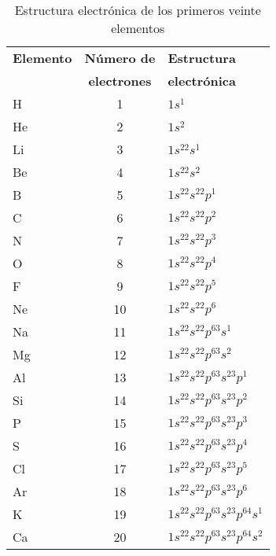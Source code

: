 \begin{table}[ht]
\caption[Estructuras electr\'onicas]{Estructura electr\'onica de los primeros veinte
elementos}
\label{tabla3.3}
\begin{center}
{\small
 \begin{tabular}{lcl}\hline
\textbf{Elemento} & \textbf{N\'umero de} &\textbf{ Estructura} \\
    &       \textbf{electrones}& \textbf{electr\'onica}\\ \hline
H   &  1 & $1s^1$\\
He  &  2 & $1s^2$\\
Li  &  3 & $1s^22s^1$\\
Be  &  4 & $1s^22s^2$\\
B   &  5 & $1s^22s^22p^1$\\
C   &  6 & $1s^22s^22p^2$\\
N   &  7 & $1s^22s^22p^3$\\
O   &  8 & $1s^22s^22p^4$\\
F   &  9 & $1s^22s^22p^5$\\
Ne  & 10 & $1s^22s^22p^6$\\
Na  & 11 & $1s^22s^22p^63s^1$\\
Mg  & 12 & $1s^22s^22p^63s^2$\\
Al  & 13 & $1s^22s^22p^63s^23p^1$\\
Si  & 14 & $1s^22s^22p^63s^23p^2$\\
P   & 15 & $1s^22s^22p^63s^23p^3$\\
S   & 16 & $1s^22s^22p^63s^23p^4$\\
Cl  & 17 & $1s^22s^22p^63s^23p^5$\\
Ar  & 18 & $1s^22s^22p^63s^23p^6$\\
K   & 19 & $1s^22s^22p^63s^23p^64s^1$\\
Ca  & 20 & $1s^22s^22p^63s^23p^64s^2$\\ \hline 
\end{tabular}
}
\end{center}
\end{table} 

